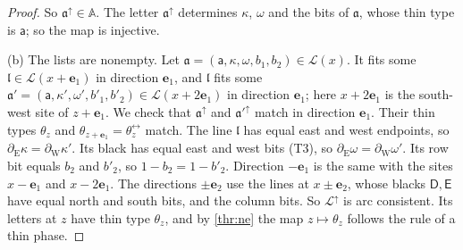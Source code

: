 \begin{proof}
So $\mathfrak a^{\uparrow}\in\mathbb A$. The letter $\mathfrak a^{\uparrow}$ determines $\kappa$, $\omega$ and the bits of $\mathfrak a$, whose thin type is $\mathsf a$; so the map is injective.

(b) The lists are nonempty. Let $\mathfrak a=(\mathsf a,\kappa,\omega,b_1,b_2)\in\mathcal L(x)$. It fits some $\mathfrak l\in\mathcal L(x+\mathbf e_1)$ in direction $\mathbf e_1$, and $\mathfrak l$ fits some $\mathfrak a'=(\mathsf a,\kappa',\omega',b'_1,b'_2)\in\mathcal L(x+2\mathbf e_1)$ in direction $\mathbf e_1$; here $x+2\mathbf e_1$ is the south-west site of $z+\mathbf e_1$. We check that $\mathfrak a^{\uparrow}$ and $\mathfrak a'^{\uparrow}$ match in direction $\mathbf e_1$. Their thin types $\theta_z$ and $\theta_{z+\mathbf e_1}=\theta_z^{\leftrightarrow}$ match. The line $\mathfrak l$ has equal east and west endpoints, so $\partial_{\mathrm E}\kappa=\partial_{\mathrm W}\kappa'$. Its black has equal east and west bits (T3), so $\partial_{\mathrm E}\omega=\partial_{\mathrm W}\omega'$. Its row bit equals $b_2$ and $b'_2$, so $1-b_2=1-b'_2$. Direction $-\mathbf e_1$ is the same with the sites $x-\mathbf e_1$ and $x-2\mathbf e_1$. The directions $\pm\mathbf e_2$ use the lines at $x\pm\mathbf e_2$, whose blacks $\mathsf D,\mathsf E$ have equal north and south bits, and the column bits. So $\mathcal L^{\uparrow}$ is arc consistent. Its letters at $z$ have thin type $\theta_z$, and by \cref{thr:ne} the map $z\mapsto\theta_z$ follows the rule of a thin phase.


\end{proof}
